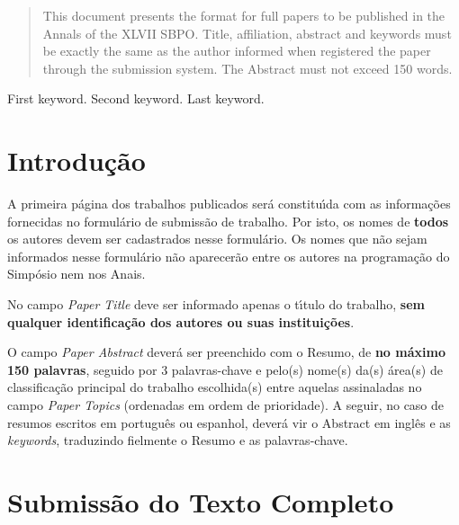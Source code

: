 \documentclass[a4paper,11pt]{article}
\begin{document}
  \vspace{8mm}

  \begin{abstract}
    This document presents the format for full papers to be published in the Annals of the XLVII SBPO.
    Title, affiliation, abstract and keywords must be exactly the same as the author informed when registered the paper through the submission system. 
    The Abstract must not exceed 150 words.
  \end{abstract}
  \bigskip

  \begin{keywords}
    First keyword. Second keyword. Last keyword.

    \bigskip
  \end{keywords}

 
  \newpage
  \section{Introdu\c{c}\~ao}
 
    A primeira p\'agina dos trabalhos publicados ser\'a constitu\'\i da com as informa\c c\~oes fornecidas
    no formul\'ario de submiss\~ao de trabalho.
    Por isto, os nomes de \textbf {todos} os autores devem ser cadastrados nesse formul\'ario.
    Os nomes que n\~ao sejam informados nesse formul\'ario n\~ao aparecer\~ao entre os autores
    na programa\c c\~ao do Simp\'osio nem nos Anais.

    No campo \textit{Paper Title} deve ser informado apenas o t\'\i tulo do trabalho,
    \textbf{ sem qualquer identifica\-\c c\~ao dos autores ou suas institui\c c\~oes}.

    O campo \textit{Paper Abstract} dever\'a ser preenchido com o Resumo, de \textbf{no m\'aximo 150 palavras},
    seguido por 3 palavras-chave e pelo(s) nome(s) da(s) \'area(s) de classifica\c c\~ao principal do trabalho escolhida(s) 
    entre aquelas assinaladas no campo \textit{ Paper Topics} (ordenadas em ordem de prioridade). 
    A seguir, no caso de resumos escritos em portugu\^es ou espanhol, dever\'a vir o Abstract em ingl\^es
    e as \textit{keywords}, traduzindo fielmente o Resumo e as palavras-chave. 


  \section{Submiss\~ao do Texto Completo}
\end{document}
